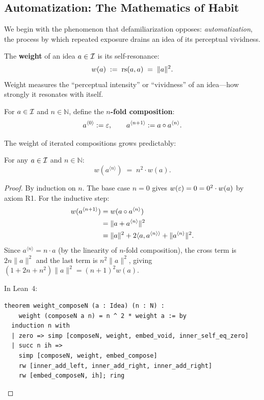 \subsection{Automatization: The Mathematics of Habit}

We begin with the phenomenon that defamiliarization opposes: \emph{automatization},
the process by which repeated exposure drains an idea of its perceptual vividness.

\begin{definition}
\label{def:weight}
The \textbf{weight} of an idea $a \in \mathcal{I}$ is its self-resonance:
\[
  w(a) \;:=\; \mathrm{rs}(a, a) \;=\; \|a\|^2.
\]
Weight measures the ``perceptual intensity'' or ``vividness'' of an idea---how
strongly it resonates with itself.
\end{definition}

\begin{definition}
\label{def:composeN}
For $a \in \mathcal{I}$ and $n \in \mathbb{N}$, define the \textbf{$n$-fold composition}:
\[
  a^{\langle 0 \rangle} := \varepsilon, \qquad
  a^{\langle n+1 \rangle} := a \circ a^{\langle n \rangle}.
\]
\end{definition}

The weight of iterated compositions grows predictably:

\begin{theorem}
\label{thm:weight-iterate}
For any $a \in \mathcal{I}$ and $n \in \mathbb{N}$:
\[
  w(a^{\langle n \rangle}) \;=\; n^2 \cdot w(a).
\]
\end{theorem}

\begin{proof}
By induction on $n$.  The base case $n = 0$ gives $w(\varepsilon) = 0 = 0^2 \cdot w(a)$
by axiom R1.  For the inductive step:
\begin{align*}
  w(a^{\langle n+1 \rangle})
  &= w(a \circ a^{\langle n \rangle}) \\
  &= \|a + a^{\langle n \rangle}\|^2 \\
  &= \|a\|^2 + 2\langle a, a^{\langle n \rangle \rangle}
     + \|a^{\langle n \rangle}\|^2.
\end{align*}
Since $a^{\langle n \rangle} = n \cdot a$ (by the linearity of
$n$-fold composition), the cross term is $2n\|a\|^2$ and the last
term is $n^2\|a\|^2$, giving $(1 + 2n + n^2)\|a\|^2 =
(n+1)^2 w(a)$.

In Lean~4:
\begin{lstlisting}
theorem weight_composeN (a : Idea) (n : N) :
    weight (composeN a n) = n ^ 2 * weight a := by
  induction n with
  | zero => simp [composeN, weight, embed_void, inner_self_eq_zero]
  | succ n ih =>
    simp [composeN, weight, embed_compose]
    rw [inner_add_left, inner_add_right, inner_add_right]
    rw [embed_composeN, ih]; ring
\end{lstlisting}
\end{proof}

